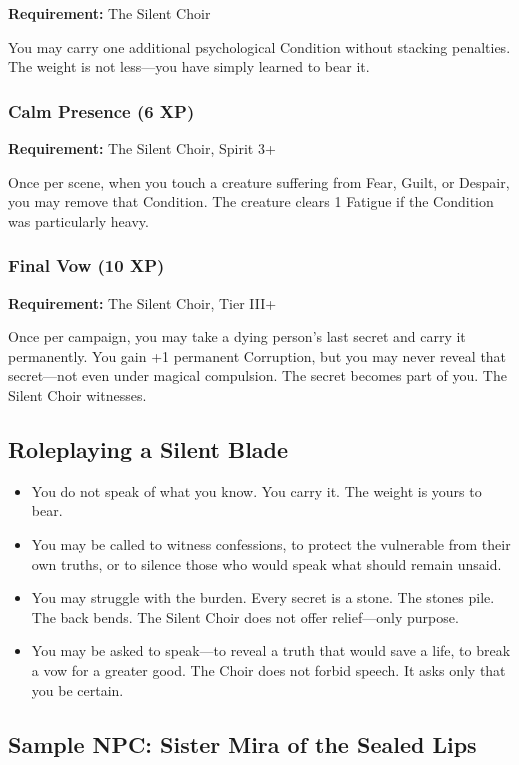 \textbf{Requirement:} The Silent Choir

You may carry one additional psychological Condition without stacking penalties. The weight is not less—you have simply learned to bear it.

\subsubsection{Calm Presence (6 XP)}

\textbf{Requirement:} The Silent Choir, Spirit 3+

Once per scene, when you touch a creature suffering from Fear, Guilt, or Despair, you may remove that Condition. The creature clears 1 Fatigue if the Condition was particularly heavy.

\subsubsection{Final Vow (10 XP)}

\textbf{Requirement:} The Silent Choir, Tier III+

Once per campaign, you may take a dying person's last secret and carry it permanently. You gain +1 permanent Corruption, but you may never reveal that secret—not even under magical compulsion. The secret becomes part of you. The Silent Choir witnesses.

\subsection{Roleplaying a Silent Blade}

\begin{itemize}
\item You do not speak of what you know. You carry it. The weight is yours to bear.
\item You may be called to witness confessions, to protect the vulnerable from their own truths, or to silence those who would speak what should remain unsaid.
\item You may struggle with the burden. Every secret is a stone. The stones pile. The back bends. The Silent Choir does not offer relief—only purpose.
\item You may be asked to speak—to reveal a truth that would save a life, to break a vow for a greater good. The Choir does not forbid speech. It asks only that you be certain.
\end{itemize}

\subsection{Sample NPC: Sister Mira of the Sealed Lips}

